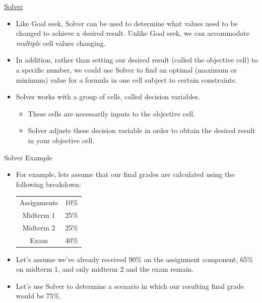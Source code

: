\documentclass[xcolor=svgnames]{beamer}
\begin{document}
\begin{frame}{\href{https://support.office.com/en-us/article/define-and-solve-a-problem-by-using-solver-5d1a388f-079d-43ac-a7eb-f63e45925040}{Solver}}
\begin{itemize}
\item Like Goal seek, Solver can be used to determine what values need to be changed to achieve a desired result.  Unlike Goal seek, we can accommodate \textit{multiple} cell values changing.
\medskip
\item In addition, rather than setting our desired result (called the objective cell) to a specific number, we could use Solver to find an optimal (maximum or minimum) value for a formula in one cell subject to certain constraints. 
\medskip
\item Solver works with a group of cells, called decision variables.
\begin{itemize}
\item These cells are necessarily inputs to the objective cell.
\item Solver adjusts these decision variable in order to obtain the desired result in your objective cell.
\end{itemize}

\end{itemize}

\end{frame}


\begin{frame}{Solver Example}
\begin{itemize}
\item For example, lets assume that our final grades are calculated using the following breakdown:
\begin{table}[htdp]
\begin{center}
\begin{tabular}{|c|c|}
\hline
Assignments&10\%\\
Midterm 1& 25\%\\
Midterm 2& 25\%\\
Exam & 40\%\\
\hline
\end{tabular}
\end{center}
\label{default}
\end{table}%
\item Let's assume we've already received 90\% on the assignment component, 65\% on midterm 1, and only midterm 2 and the  exam remain.
\medskip
\item Let's use Solver to determine a scenario in which our resulting final grade would be 75\%.
\medskip
\end{itemize}
\end{frame}
\end{document}
